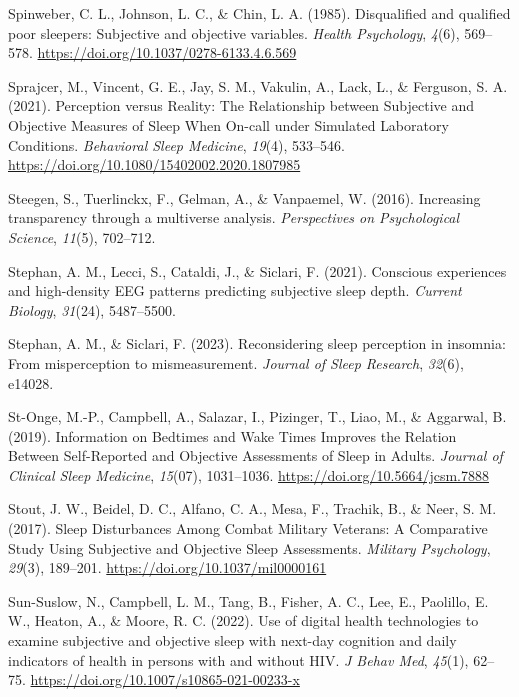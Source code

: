 \documentclass[
]{article}
\newlength{\cslhangindent}
\newenvironment{CSLReferences}[2] %
 {\begin{list}{}{%
  \setlength{\itemindent}{0pt}
  \setlength{\leftmargin}{0pt}
  \setlength{\parsep}{0pt}
  \ifodd #1
   \setlength{\leftmargin}{\cslhangindent}
   \setlength{\itemindent}{-1\cslhangindent}
  \fi
  \setlength{\itemsep}{#2\baselineskip}}}
 {\end{list}}
\begin{document}
\begin{CSLReferences}{1}{0}
Spinweber, C. L., Johnson, L. C., \& Chin, L. A. (1985). Disqualified and qualified poor sleepers: {Subjective} and objective variables. \emph{Health Psychology}, \emph{4}(6), 569--578. \url{https://doi.org/10.1037/0278-6133.4.6.569}

Sprajcer, M., Vincent, G. E., Jay, S. M., Vakulin, A., Lack, L., \& Ferguson, S. A. (2021). Perception versus {Reality}: {The} {Relationship} between {Subjective} and {Objective} {Measures} of {Sleep} {When} {On}-call under {Simulated} {Laboratory} {Conditions}. \emph{Behavioral Sleep Medicine}, \emph{19}(4), 533--546. \url{https://doi.org/10.1080/15402002.2020.1807985}

Steegen, S., Tuerlinckx, F., Gelman, A., \& Vanpaemel, W. (2016). Increasing transparency through a multiverse analysis. \emph{Perspectives on Psychological Science}, \emph{11}(5), 702--712.

Stephan, A. M., Lecci, S., Cataldi, J., \& Siclari, F. (2021). Conscious experiences and high-density EEG patterns predicting subjective sleep depth. \emph{Current Biology}, \emph{31}(24), 5487--5500.

Stephan, A. M., \& Siclari, F. (2023). Reconsidering sleep perception in insomnia: From misperception to mismeasurement. \emph{Journal of Sleep Research}, \emph{32}(6), e14028.

St-Onge, M.-P., Campbell, A., Salazar, I., Pizinger, T., Liao, M., \& Aggarwal, B. (2019). Information on {Bedtimes} and {Wake} {Times} {Improves} the {Relation} {Between} {Self}-{Reported} and {Objective} {Assessments} of {Sleep} in {Adults}. \emph{Journal of Clinical Sleep Medicine}, \emph{15}(07), 1031--1036. \url{https://doi.org/10.5664/jcsm.7888}

Stout, J. W., Beidel, D. C., Alfano, C. A., Mesa, F., Trachik, B., \& Neer, S. M. (2017). Sleep {Disturbances} {Among} {Combat} {Military} {Veterans}: {A} {Comparative} {Study} {Using} {Subjective} and {Objective} {Sleep} {Assessments}. \emph{Military Psychology}, \emph{29}(3), 189--201. \url{https://doi.org/10.1037/mil0000161}

Sun-Suslow, N., Campbell, L. M., Tang, B., Fisher, A. C., Lee, E., Paolillo, E. W., Heaton, A., \& Moore, R. C. (2022). Use of digital health technologies to examine subjective and objective sleep with next-day cognition and daily indicators of health in persons with and without {HIV}. \emph{J Behav Med}, \emph{45}(1), 62--75. \url{https://doi.org/10.1007/s10865-021-00233-x}


\end{CSLReferences}
\end{document}
